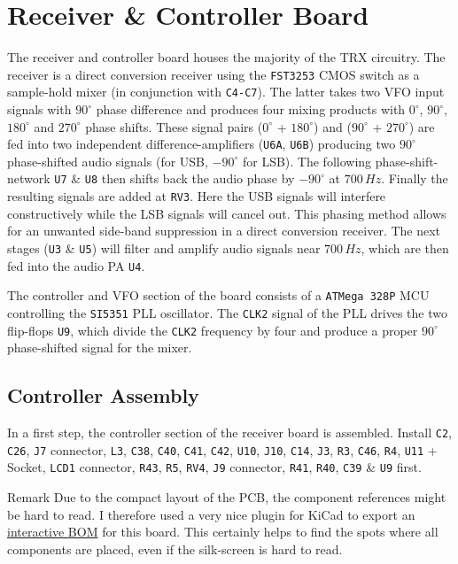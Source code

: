 \documentclass[10pt, a4paper,twoside]{scrartcl}
\newenvironment{remark}{\begin{bclogo}[couleur=blue!30,arrondi=.1,logo=\bcinfo,ombre=true]{Remark}}{\end{bclogo}}
\begin{document}
\section{Receiver \& Controller Board} \label{sec:rx}
 The receiver and controller board houses the majority of the TRX circuitry. The receiver is a direct conversion receiver using the \texttt{FST3253} CMOS switch as a sample-hold mixer (in conjunction with \texttt{C4-C7}). The latter takes two VFO input signals with $90^\circ$ phase difference and produces four mixing products with $0^\circ$, $90^\circ$, $180^\circ$ and $270^\circ$ phase shifts. These signal pairs ($0^\circ$ + $180^\circ$) and ($90^\circ$ + $270^\circ$) are fed into two independent difference-amplifiers (\texttt{U6A}, \texttt{U6B}) producing two $90^\circ$ phase-shifted audio signals (for USB, $-90^\circ$ for LSB). The following phase-shift-network \texttt{U7} \& \texttt{U8} then shifts back the audio phase by $-90^\circ$ at $700\,Hz$. Finally the resulting signals are added at \texttt{RV3}. Here the USB signals will interfere constructively while the LSB signals will cancel out. This phasing method allows for an unwanted side-band suppression in a direct conversion receiver. The next stages (\texttt{U3} \& \texttt{U5}) will filter and amplify audio signals near $700\,Hz$, which are then fed into the audio PA \texttt{U4}. 
 
 The controller and VFO section of the board consists of a \texttt{ATMega 328P} MCU controlling the \texttt{SI5351} PLL oscillator. The \texttt{CLK2} signal of the PLL drives the two flip-flops \texttt{U9}, which divide the \texttt{CLK2} frequency by four and produce a proper $90^\circ$ phase-shifted signal for the mixer.
 
\subsection{Controller Assembly}
 In a first step, the controller section of the receiver board is assembled. Install \texttt{C2}, \texttt{C26}, \texttt{J7} connector, \texttt{L3}, \texttt{C38}, \texttt{C40}, \texttt{C41}, \texttt{C42}, \texttt{U10}, \texttt{J10}, \texttt{C14}, \texttt{J3}, \texttt{R3}, \texttt{C46}, \texttt{R4}, \texttt{U11} + Socket, \texttt{LCD1} connector, \texttt{R43}, \texttt{R5}, \texttt{RV4}, \texttt{J9} connector, \texttt{R41}, \texttt{R40}, \texttt{C39} \& \texttt{U9} first. 

\begin{remark}
 Due to the compact layout of the PCB, the component references might be hard to read. I therefore used a very nice plugin for KiCad to export an \href{https://dm3mat.darc.de/cw2019/rx_rev2_ibom.html}{interactive BOM} for this board. This certainly helps to find the spots where all components are placed, even if the silk-screen is hard to read.
\end{remark}
\end{document}
